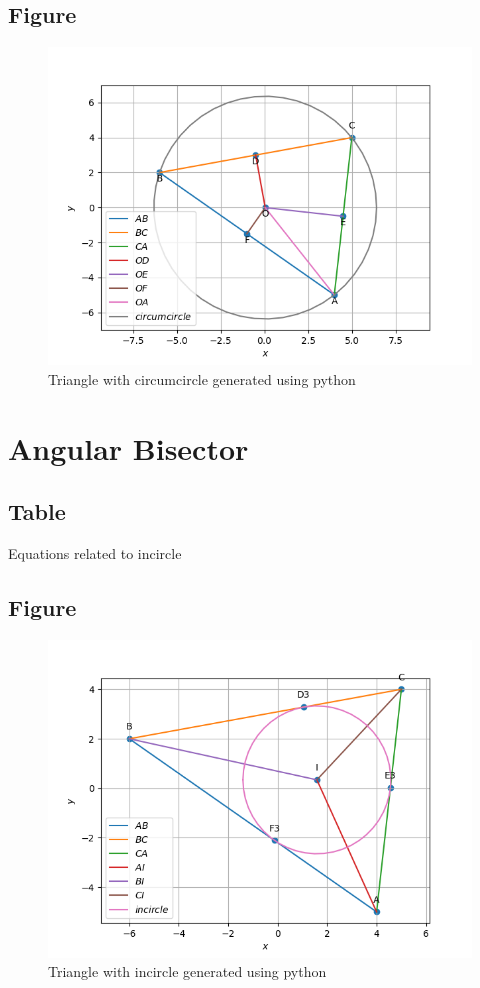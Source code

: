 \documentclass[journal,12pt,onecolumn]{IEEEtran}
\theoremstyle{remark}
\begin{document}
\subsection{Figure}
\begin{figure}[!htb]
	\centering
	\includegraphics[width=\columnwidth]{figs/4.png}
	\caption{Triangle with circumcircle generated using python}
	\label{fig58:Triangle_with_circumcircle}	
\end{figure}

\section{Angular Bisector}
\subsection{Table}
\begin{table}[!htb]
	
	\caption{Equations related to incircle}
	\label{tab58:equations_incircle}	
\end{table}
\subsection{Figure}
\begin{figure}[!htb]
	\centering
	\includegraphics[width=\columnwidth]{figs/5.png}
	\caption{Triangle with incircle generated using python}
	\label{fig58:Triangle_with_incircle}	
\end{figure}
\end{document}
